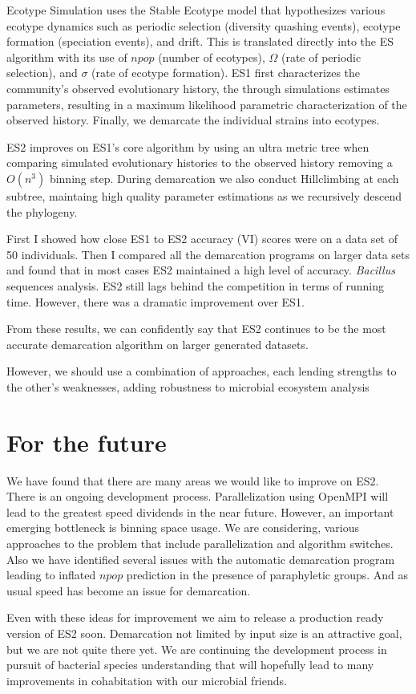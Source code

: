 Ecotype Simulation uses the Stable Ecotype model that hypothesizes various ecotype dynamics such as periodic selection (diversity quashing events), ecotype formation (speciation events), and drift.
This is translated directly into the ES algorithm with its use of $npop$ (number of ecotypes), $\Omega$ (rate of periodic selection), and $\sigma$ (rate of ecotype formation).
ES1 first characterizes the community's observed evolutionary history, the through simulations estimates parameters, resulting in a maximum likelihood parametric characterization of the observed history.
Finally, we demarcate the individual strains into ecotypes.

ES2 improves on ES1's core algorithm by using an ultra metric tree when comparing simulated evolutionary histories to the observed history removing a $O(n^3)$ binning step.
During demarcation we also conduct Hillclimbing at each subtree, maintaing high quality parameter estimations as we recursively descend the phylogeny.

First I showed how close ES1 to ES2 accuracy (VI) scores were on a data set of 50 individuals.
Then I compared all the demarcation programs on larger data sets and found that in most cases ES2 maintained a high level of accuracy.
\emph{Bacillus} sequences analysis.
ES2 still lags behind the competition in terms of running time.
However, there was a dramatic improvement over ES1.

From these results, we can confidently say that ES2 continues to be the most accurate demarcation algorithm on larger generated datasets.

However, we should use a combination of approaches, each lending strengths to the other's weaknesses, adding robustness to microbial ecosystem analysis~\cite{bohannan2003new}

\section{For the future}
We have found that there are many areas we would like to improve on ES2.
There is an ongoing development process.
Parallelization using OpenMPI will lead to the greatest speed dividends in the near future.
However, an important emerging bottleneck is binning space usage.
We are considering, various approaches to the problem that include parallelization and algorithm switches.
Also we have identified several issues with the automatic demarcation program leading to inflated $npop$ prediction in the presence of paraphyletic groups.
And as usual speed has become an issue for demarcation.

Even with these ideas for improvement we aim to release a production ready version of ES2 soon.
Demarcation not limited by input size is an attractive goal, but we are not quite there yet.
We are continuing the development process in pursuit of bacterial species understanding that will hopefully lead to many improvements in cohabitation with our microbial friends.


